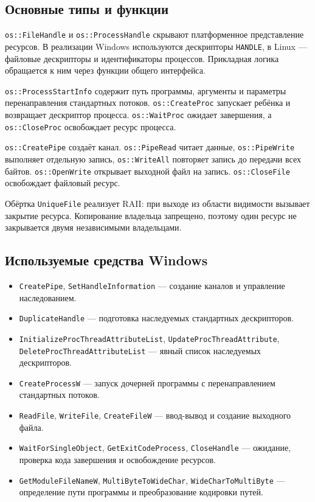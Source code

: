 \subsection{Основные типы и функции}
\texttt{os::FileHandle} и \texttt{os::ProcessHandle} скрывают платформенное представление ресурсов. В реализации Windows используются дескрипторы \texttt{HANDLE}, в Linux --- файловые дескрипторы и идентификаторы процессов. Прикладная логика обращается к ним через функции общего интерфейса.

\texttt{os::ProcessStartInfo} содержит путь программы, аргументы и параметры перенаправления стандартных потоков. \texttt{os::CreateProc} запускает ребёнка и возвращает дескриптор процесса. \texttt{os::WaitProc} ожидает завершения, а \texttt{os::CloseProc} освобождает ресурс процесса.

\texttt{os::CreatePipe} создаёт канал. \texttt{os::PipeRead} читает данные, \texttt{os::PipeWrite} выполняет отдельную запись, \texttt{os::WriteAll} повторяет запись до передачи всех байтов. \texttt{os::OpenWrite} открывает выходной файл на запись. \texttt{os::CloseFile} освобождает файловый ресурс.

Обёртка \texttt{UniqueFile} реализует RAII: при выходе из области видимости вызывает закрытие ресурса. Копирование владельца запрещено, поэтому один ресурс не закрывается двумя независимыми владельцами.

\subsection{Используемые средства Windows}
\begin{itemize}
\item \texttt{CreatePipe}, \texttt{SetHandleInformation} --- создание каналов и управление наследованием.
\item \texttt{DuplicateHandle} --- подготовка наследуемых стандартных дескрипторов.
\item \texttt{InitializeProcThreadAttributeList}, \texttt{UpdateProcThreadAttribute}, \texttt{DeleteProcThreadAttributeList} --- явный список наследуемых дескрипторов.
\item \texttt{CreateProcessW} --- запуск дочерней программы с перенаправлением стандартных потоков.
\item \texttt{ReadFile}, \texttt{WriteFile}, \texttt{CreateFileW} --- ввод-вывод и создание выходного файла.
\item \texttt{WaitForSingleObject}, \texttt{GetExitCodeProcess}, \texttt{CloseHandle} --- ожидание, проверка кода завершения и освобождение ресурсов.
\item \texttt{GetModuleFileNameW}, \texttt{MultiByteToWideChar}, \texttt{WideCharToMultiByte} --- определение пути программы и преобразование кодировки путей.
\end{itemize}

